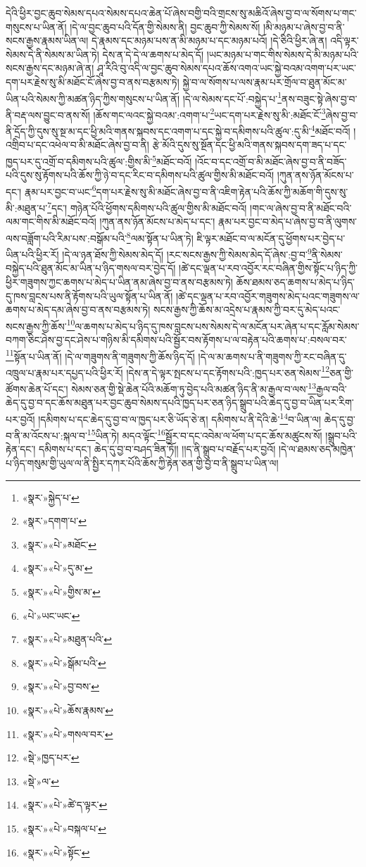 དེའི་ཕྱིར་བྱང་ཆུབ་སེམས་དཔའ་སེམས་དཔའ་ཆེན་པོ་ཞེས་བགྱི་བའི་གྲངས་སུ་མཆིའོ་ཞེས་བྱ་བ་ལ་སོགས་པ་གང་གསུངས་པ་ཡིན་ནོ། །དེ་ལ་བྱང་ཆུབ་པའི་དོན་གྱི་སེམས་ནི། བྱང་ཆུབ་ཀྱི་སེམས་སོ། །མི་མཉམ་པ་ཞེས་བྱ་བ་ནི་སངས་རྒྱས་རྣམས་ཡིན་ལ། དེ་རྣམས་དང་མཉམ་པས་ན་མི་མཉམ་པ་དང་མཉམ་པའོ། །དེ་ཅིའི་ཕྱིར་ཞེ་ན། འདི་ལྟར་སེམས་དེ་ནི་སེམས་མ་ཡིན་ཏེ། དེས་ན་དེ་དེ་ལ་ཆགས་པ་མེད་དོ། །ཡང་མཉམ་པ་གང་གིས་སེམས་དེ་མི་མཉམ་པའི་སངས་རྒྱས་དང་མཉམ་ཞེ་ན། ཤཱ་རིའི་བུ་འདི་ལ་བྱང་ཆུབ་སེམས་དཔའ་ཆོས་འགའ་ཡང་སྐྱེ་བའམ་འགག་པར་ཡང་དག་པར་རྗེས་སུ་མི་མཐོང་ངོ་ཞེས་བྱ་བ་ནས་བརྩམས་ཏེ། སྐྱེ་བ་ལ་སོགས་པ་ལས་རྣམ་པར་གྲོལ་བ་ཐུན་མོང་མ་ཡིན་པའི་སེམས་ཀྱི་མཚན་ཉིད་ཀྱིས་གསུངས་པ་ཡིན་ནོ། །དེ་ལ་སེམས་དང་པོ་:བསྐྱེད་པ་\footnote{«སྣར་»སྐྱེད་པ་}ནས་བཟུང་སྟེ་ཞེས་བྱ་བ་ནི་བརྡ་ལས་བྱུང་བ་ནས་སོ། །ཆོས་གང་ལའང་སྐྱེ་བའམ་:འགག་པ་\footnote{«སྣར་»དགག་པ་}ཡང་དག་པར་རྗེས་སུ་མི་:མཐོང་ངོ་\footnote{«སྣར་»«པེ་»མཐོང་}ཞེས་བྱ་བ་ནི་དྲོད་ཀྱི་དུས་སུ་སྔ་མ་དང་ཕྱི་མའི་གནས་སྐབས་དང་འགག་པ་དང་སྐྱེ་བ་དམིགས་པའི་ཚུལ་:དུ་མི་\footnote{«སྣར་»«པེ་»དུ་མ་}མཐོང་བའོ། །འགྲིབ་པ་དང་འཕེལ་བ་མི་མཐོང་ཞེས་བྱ་བ་ནི། རྩེ་མོའི་དུས་སུ་སྔོན་དང་ཕྱི་མའི་གནས་སྐབས་དག་ཟད་པ་དང་ཁྱད་པར་དུ་འགྲོ་བ་དམིགས་པའི་ཚུལ་:གྱིས་མི་\footnote{«སྣར་»«པེ་»གྱིས་མ་}མཐོང་བའོ། །འོང་བ་དང་འགྲོ་བ་མི་མཐོང་ཞེས་བྱ་བ་ནི་བཟོད་པའི་དུས་སུ་རྟོགས་པའི་ཆོས་ཀྱི་ཉེ་བ་དང་རིང་བ་དམིགས་པའི་ཚུལ་གྱིས་མི་མཐོང་བའོ། །ཀུན་ནས་ཉོན་མོངས་པ་དང་། རྣམ་པར་བྱང་བ་ཡང་\footnote{«པེ་»ཡང་ཡང་}དག་པར་རྗེས་སུ་མི་མཐོང་ཞེས་བྱ་བ་ནི་འཇིག་རྟེན་པའི་ཆོས་ཀྱི་མཆོག་གི་དུས་སུ་མི་:མཐུན་པ་\footnote{«སྣར་»«པེ་»མཐུན་པའི་}དང་། གཉེན་པོའི་ཕྱོགས་དམིགས་པའི་ཚུལ་གྱིས་མི་མཐོང་བའོ། །གང་ལ་ཞེས་བྱ་བ་ནི་མཐོང་བའི་ལམ་གང་གིས་མི་མཐོང་བའོ། །ཀུན་ནས་ཉོན་མོངས་པ་མེད་པ་དང་། རྣམ་པར་བྱང་བ་མེད་པ་ཞེས་བྱ་བ་ནི་ལུགས་ལས་བཟློག་པའི་རིམ་པས་:བསྒོམ་པའི་\footnote{«སྣར་»«པེ་»སྒོམ་པའི་}ལམ་སྟོན་པ་ཡིན་ཏེ། ཇི་ལྟར་མཐོང་བ་ལ་མངོན་དུ་ཕྱོགས་པར་བྱེད་པ་ཡིན་པའི་ཕྱིར་རོ། །དེ་ལ་ཉན་ཐོས་ཀྱི་སེམས་མེད་དོ། །རང་སངས་རྒྱས་ཀྱི་སེམས་མེད་དོ་ཞེས་:བྱ་བ་\footnote{«སྣར་»«པེ་»བྱ་བས་}ནི་སེམས་བསྐྱེད་པའི་ཐུན་མོང་མ་ཡིན་པ་ཉིད་གསལ་བར་བྱེད་དོ། །ཚེ་དང་ལྡན་པ་རབ་འབྱོར་རང་བཞིན་གྱིས་སྟོང་པ་ཉིད་ཀྱི་ཕྱིར་གཟུགས་ཀྱང་ཆགས་པ་མེད་པ་ཡིན་ནམ་ཞེས་བྱ་བ་ནས་བརྩམས་ཏེ། ཆོས་ཐམས་ཅད་ཆགས་པ་མེད་པ་ཉིད་དུ་ཁས་བླངས་པས་ནི་རྟོགས་པའི་ཡུལ་སྟོན་པ་ཡིན་ནོ། །ཚེ་དང་ལྡན་པ་རབ་འབྱོར་གཟུགས་མེད་པའང་གཟུགས་ལ་ཆགས་པ་མེད་དམ་ཞེས་བྱ་བ་ནས་བརྩམས་ཏེ། སངས་རྒྱས་ཀྱི་ཆོས་མ་འདྲེས་པ་རྣམས་ཀྱི་བར་དུ་མེད་པའང་སངས་རྒྱས་ཀྱི་ཆོས་\footnote{«སྣར་»«པེ་»ཆོས་རྣམས་}ལ་ཆགས་པ་མེད་པ་ཉིད་དུ་ཁས་བླངས་པས་སེམས་དེ་ལ་མངོན་པར་ཞེན་པ་དང་རློམ་སེམས་བཀག་ཅིང་ཤེས་བྱ་དང་ཤེས་པ་གཉིས་མི་དམིགས་པའི་སྦྱོར་བས་རྟོགས་པ་ལ་བརྟེན་པའི་ཆགས་པ་:བསལ་བར་\footnote{«སྣར་»«པེ་»གསལ་བར་}སྟོན་པ་ཡིན་ནོ། །དེ་ལ་གཟུགས་ནི་གཟུགས་ཀྱི་ཆོས་ཉིད་དོ། །དེ་ལ་མ་ཆགས་པ་ནི་གཟུགས་ཀྱི་རང་བཞིན་དུ་འཁྲུལ་པ་རྣམ་པར་དཔྱད་པའི་ཕྱིར་རོ། །དེས་ན་དེ་ལྟར་སྤངས་པ་དང་རྟོགས་པའི་:ཁྱད་པར་ཅན་སེམས་\footnote{«སྡེ་»ཁྱད་པར་}ཅན་གྱི་ཚོགས་ཆེན་པོ་དང་། སེམས་ཅན་གྱི་སྡེ་ཆེན་པོའི་མཆོག་ཏུ་བྱེད་པའི་མཚན་ཉིད་ནི་མ་རྒྱལ་བ་ལས་\footnote{«སྡེ་»ལ་}རྒྱལ་བའི་ཆེད་དུ་བྱ་བ་དང་ཆོས་མཐུན་པར་བྱང་ཆུབ་སེམས་དཔའི་ཁྱད་པར་ཅན་ཉིད་སྒྲུབ་པའི་ཆེད་དུ་བྱ་བ་ཡིན་པར་རིག་པར་བྱའོ། །དམིགས་པ་དང་ཆེད་དུ་བྱ་བ་ལ་ཁྱད་པར་ཅི་ཡོད་ཅེ་ན། དམིགས་པ་ནི་དེའི་ཆེ་\footnote{«སྣར་»«པེ་»ཚེ་ད་ལྟར་}བ་ཡིན་ལ། ཆེད་དུ་བྱ་བ་ནི་མ་འོངས་པ་:སྐལ་བ་\footnote{«སྣར་»«པེ་»བསྐལ་པ་}ཡིན་ཏེ། མདའ་ལྟོང་\footnote{«སྣར་»«པེ་»སྟོང་}སྦྱོར་བ་དང་འབེམ་ལ་ཕོག་པ་དང་ཆོས་མཚུངས་སོ། །སྒྲུབ་པའི་རྟེན་དང་། དམིགས་པ་དང་། ཆེད་དུ་བྱ་བ་བཤད་ཟིན་ཏོ།། །།ད་ནི་སྒྲུབ་པ་བརྗོད་པར་བྱའོ། །དེ་ལ་ཐམས་ཅད་མཁྱེན་པ་ཉིད་གསུམ་གྱི་ཡུལ་ལ་ནི་སྤྱིར་དཀར་པོའི་ཆོས་ཀྱི་རྟེན་ཅན་གྱི་བྱ་བ་ནི་སྒྲུབ་པ་ཡིན་ལ། 